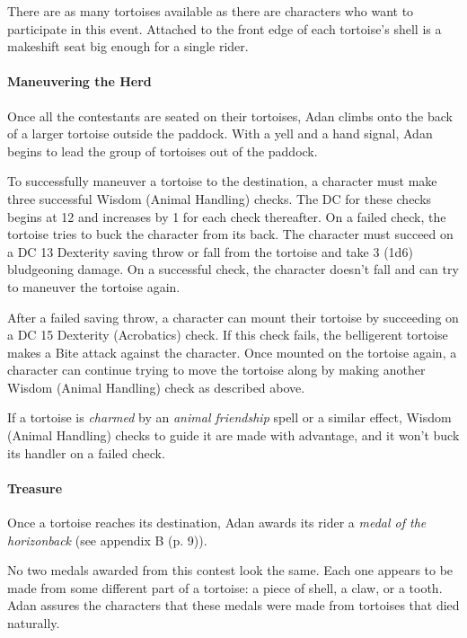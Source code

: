 \documentclass[a4paper, 11pt, bg=full, twocolumn, nooutline]{dndbook}
\begin{document}
There are as many tortoises available as there are characters who want to participate in this event. Attached to the front edge of each tortoise's shell is a makeshift seat big enough for a single rider.

\paragraph{Maneuvering the Herd}

Once all the contestants are seated on their tortoises, Adan climbs onto the back of a larger tortoise outside the paddock. With a yell and a hand signal, Adan begins to lead the group of tortoises out of the paddock.

To successfully maneuver a tortoise to the destination, a character must make three successful Wisdom (Animal Handling) checks. The DC for these checks begins at 12 and increases by 1 for each check thereafter. On a failed check, the tortoise tries to buck the character from its back. The character must succeed on a DC 13 Dexterity saving throw or fall from the tortoise and take 3 (1d6) bludgeoning damage. On a successful check, the character doesn't fall and can try to maneuver the tortoise again.

After a failed saving throw, a character can mount their tortoise by succeeding on a DC 15 Dexterity (Acrobatics) check. If this check fails, the belligerent tortoise makes a Bite attack against the character. Once mounted on the tortoise again, a character can continue trying to move the tortoise along by making another Wisdom (Animal Handling) check as described above.

If a tortoise is \textit{charmed} by an \textit{animal friendship} spell or a similar effect, Wisdom (Animal Handling) checks to guide it are made with advantage, and it won't buck its handler on a failed check.

\paragraph{Treasure}

Once a tortoise reaches its destination, Adan awards its rider a \textit{medal of the horizonback} (see appendix B (p. 9)).

No two medals awarded from this contest look the same. Each one appears to be made from some different part of a tortoise: a piece of shell, a claw, or a tooth. Adan assures the characters that these medals were made from tortoises that died naturally.
\end{document}

